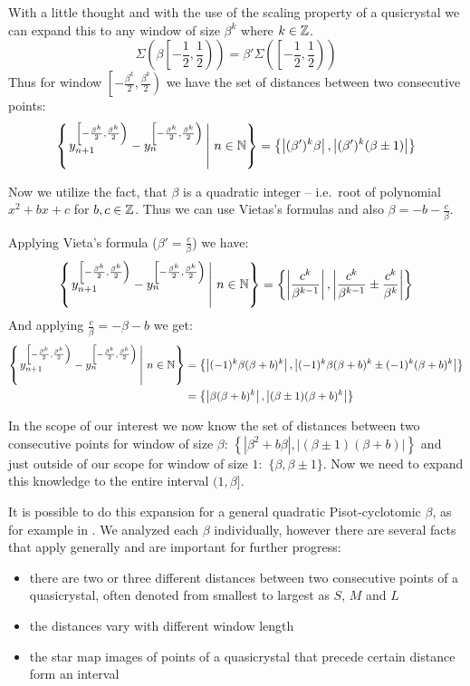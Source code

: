 \documentclass[text.tex]{subfiles}
\begin{document}
With a little thought and with the use of the scaling property of a qusicrystal we can expand this to any window of size $\beta^k$ where $k\in\mathbb{Z}$. 
$$\Sigma\left(\beta\left[-\frac{1}{2}, \frac{1}{2}\right)\right) = \beta'\Sigma\left(\left[-\frac{1}{2}, \frac{1}{2}\right)\right)$$%
Thus for window $\left[-\frac{\beta^k}{2}, \frac{\beta^k}{2}\right)$ we have the set of distances between two consecutive points:
$$\left\{\left. y^{\left[-\frac{\beta^k}{2}, \frac{\beta^k}{2}\right)}_{n+1}-y^{\left[-\frac{\beta^k}{2}, \frac{\beta^k}{2}\right)}_{n}\,\right|\, n\in\mathbb{N} \right\} =\left\{\left|(\beta')^k\beta\right|, \left|(\beta')^k(\beta \pm 1)\right|\right\}$$ %

Now we utilize the fact, that $\beta$ is a quadratic integer -- i.e.\ root of polynomial $x^2+bx+c$ for $b,c\in\mathbb{Z}$. Thus we can use Vietas's formulas and also $\beta = -b-\frac{c}{\beta}$. 

Applying Vieta's formula ($\beta' = \frac{c}{\beta}$) we have:
$$\left\{\left. y^{\left[-\frac{\beta^k}{2}, \frac{\beta^k}{2}\right)}_{n+1}-y^{\left[-\frac{\beta^k}{2}, \frac{\beta^k}{2}\right)}_{n}\,\right|\, n\in\mathbb{N} \right\} = \left\{\left|\frac{c^k}{\beta^{k-1}}\right|, \left|\frac{c^k}{\beta^{k-1}}\pm\frac{c^k}{\beta^{k}}\right|\right\}$$%
And applying $\frac{c}{\beta}=-\beta-b$ we get:
\begin{align*}
\left\{\left. y^{\left[-\frac{\beta^k}{2}, \frac{\beta^k}{2}\right)}_{n+1}-y^{\left[-\frac{\beta^k}{2}, \frac{\beta^k}{2}\right)}_{n}\,\right|\, n\in\mathbb{N} \right\} &= \left\{\left|(-1)^k\beta(\beta+b)^k\right|, \left|(-1)^k\beta(\beta+b)^k\pm(-1)^k(\beta+b)^k\right|\right\} \\
&= \left\{\left|\beta(\beta+b)^k\right|, \left|(\beta\pm 1)(\beta+b)^k\right|\right\}
\end{align*}%

In the scope of our interest we now know the set of distances between two consecutive points for window of size $\beta$: $\left\{\left|\beta^2+b\beta\right|, \left|(\beta\pm 1)(\beta+b)\right|\right\}$ and just outside of our scope for window of size $1$:~$\{\beta, \beta \pm 1\}$. Now we need to expand this knowledge to the entire interval $(1,\beta]$. %

It is possible to do this expansion for a general quadratic Pisot-cyclotomic $\beta$, as for example in \cite{distances}. We analyzed each $\beta$ individually, however there are several facts that apply generally and are important for further progress: 
\begin{itemize}
\item there are two or three different distances between two consecutive points of a quasicrystal, often denoted from smallest to largest as $S$, $M$ and $L$
\item the distances vary with different window length
\item the star map images of points of a quasicrystal that precede certain distance form an interval
\end{itemize}
\end{document}
